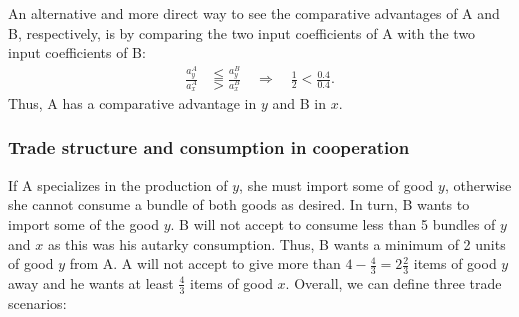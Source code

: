 An alternative and more direct way to see the comparative advantages of A and B, respectively, is by comparing the two input coefficients of A with the two input coefficients of B: 
	\begin{align*}
		\frac{a^A_y}{a^A_x} &\lesseqqgtr \frac{a^B_y}{a^B_x} \quad	\Rightarrow \quad \frac{1}{2} <\frac{0.4}{0.4}.
	\end{align*}
Thus, A has a comparative advantage in $y$ and B in $x$.




\subsubsection{Trade structure and consumption in cooperation}
If A specializes in the production of $y$, she must import some of good $y$, otherwise she cannot consume a bundle of both goods as desired. In turn, B wants to import some of the good $y$. 
B will not accept to consume less than 5 bundles of $y$ and $x$ as this was his autarky consumption. Thus, B wants a minimum of 2 units of good $y$ from A. A will not accept to give more than $4-\frac{4}{3}=2\frac{2}{3}$ items of good $y$ away and he wants at least $\frac{4}{3}$ items of good $x$. Overall, we can define three trade scenarios:

